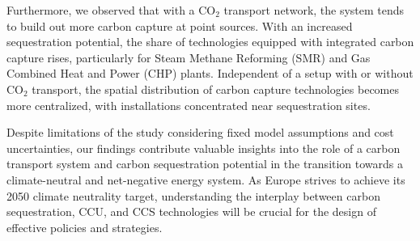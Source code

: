 \documentclass[twocolumn]{article}
\newcommand{\carbon}{CO$_2$}
\begin{document}
Furthermore, we observed that with a \carbon{} transport network, the system tends to build out more carbon capture at point sources. With an increased sequestration potential, the share of technologies equipped with integrated carbon capture rises, particularly for Steam Methane Reforming (SMR) and Gas Combined Heat and Power (CHP) plants. Independent of a setup with or without \carbon{} transport, the spatial distribution of carbon capture technologies becomes more centralized, with installations concentrated near sequestration sites.

Despite limitations of the study considering fixed model assumptions and cost uncertainties, our findings contribute valuable insights into the role of a carbon transport system and carbon sequestration potential in the transition towards a climate-neutral and net-negative energy system. As Europe strives to achieve its 2050 climate neutrality target, understanding the interplay between carbon sequestration, CCU, and CCS technologies will be crucial for the design of effective policies and strategies.


\printbibliography





\end{document}
